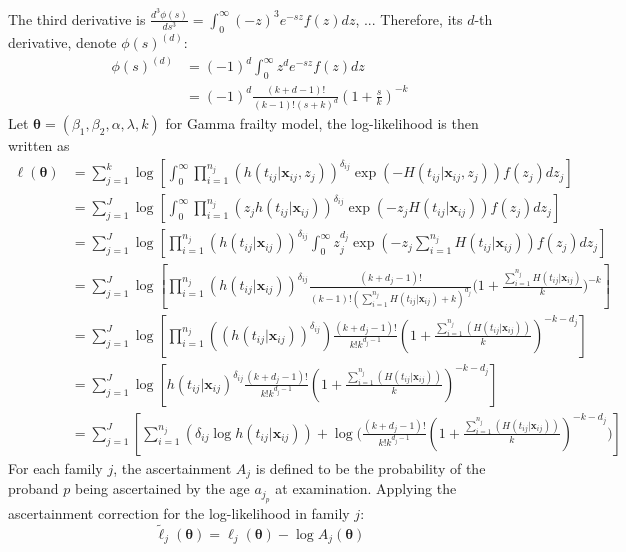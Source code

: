 \documentclass[preprint,12pt]{elsarticle}
\begin{document}
\noindent
The third derivative is $\frac{d^3\phi(s)}{ds^3}=\int_0^{\infty}(-z)^3e^{-sz}f(z)dz$, ...
Therefore, its $d$-th derivative, denote $\phi(s)^{(d)}$:
\begin{align}
    \phi(s)^{(d)}&=(-1)^d\int_0^{\infty}z^de^{-sz}f(z)dz\\
    &=(-1)^d\frac{(k+d-1)!}{(k-1)!(s+k)^d}(1+\frac{s}{k})^{-k}
\end{align}
Let $\boldsymbol{\theta}=(\beta_1, \beta_2, \alpha, \lambda, k)$ for Gamma frailty model, the log-likelihood is then written as
\begin{align}
    \ell(\boldsymbol{\theta})&=\sum_{j=1}^k\log \left [ \int_0^{\infty}\prod_{i=1}^{n_j}(h(t_{ij}|\mathbf{x}_{ij}, z_j))^{\delta_{ij}}\exp (-H(t_{ij}|\mathbf{x}_{ij}, z_j))f(z_j)dz_j\right ]\\
    &=\sum_{j=1}^J\log\left [\int_{0}^{\infty}\prod_{i=1}^{n_j}(z_j h(t_{ij}|\mathbf{x}_{ij}))^{\delta_{ij}}\exp(-z_j H(t_{ij}|\mathbf{x}_{ij}))f(z_j)dz_j\right ]\\
    &=\sum_{j=1}^J\log\left [\prod_{i=1}^{n_j}(h(t_{ij}|\mathbf{x}_{ij}))^{\delta_{ij}}\int_0^{\infty}z_j^{d_j}\exp(-z_j\sum_{i=1}^{n_j}H(t_{ij}|\mathbf{x}_{ij}))f(z_j)dz_j \right ]\\
    &=\sum_{j=1}^J\log\left [\prod_{i=1}^{n_j}(h(t_{ij}|\mathbf{x}_{ij}))^{\delta_{ij}}\frac{(k+d_j-1)!}{(k-1)!(\sum_{i=1}^{n_j}H(t_{ij}|\mathbf{x}_{ij})+k)^{d_j}}\Big(1+\frac{\sum_{i=1}^{n_j}H(t_{ij}|\mathbf{x}_{ij})}{k}\Big)^{-k}\right ]\\
    &=\sum_{j=1}^J\log\left [\prod_{i=1}^{n_j}((h(t_{ij}|\mathbf{x}_{ij}) )^{\delta_{ij}})\frac{(k+d_j-1)!}{k!k^{d_j-1}}(1+\frac{\sum_{i=1}^{n_j}(H(t_{ij}|\mathbf{x}_{ij}))}{k})^{-k-d_j} \right ]\\
    &=\sum_{j=1}^J\log\left [h(t_{ij}|\mathbf{x}_{ij})^{\delta_{ij}} \frac{(k+d_j-1)!}{k!k^{d_j-1}}(1+\frac{\sum_{i=1}^{n_j}(H(t_{ij}|\mathbf{x}_{ij}))}{k})^{-k-d_j} \right ]\\
    &=\sum_{j=1}^J\left [\sum_{i=1}^{n_j}(\delta_{ij}\log h(t_{ij}|\mathbf{x}_{ij})) + \log\Big (\frac{(k+d_j-1)!}{k!k^{d_j-1}}(1+\frac{\sum_{i=1}^{n_j}(H(t_{ij}|\mathbf{x}_{ij}))}{k})^{-k-d_j}\Big )\right ]
\end{align}
For each family $j$, the ascertainment $A_j$ is defined to be the probability of the proband $p$ being ascertained by the age $a_{j_p}$ at examination. Applying the ascertainment correction for the log-likelihood in family $j$: 
\begin{equation}
    \tilde{\ell}_{j}(\boldsymbol{\theta})=\ell_j(\boldsymbol{\theta})-\log A_j(\boldsymbol{\theta})
\end{equation}
\end{document}

